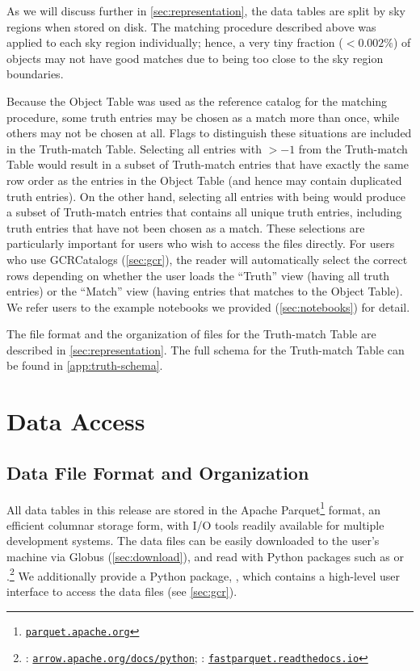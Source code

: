 \documentclass[modern]{descnote}
\newcommand*{\https}[1]{\href{https://#1}{\nolinkurl{#1}}}
\begin{document}
As we will discuss further in \autoref{sec:representation}, the data tables are split by sky regions when stored on disk. The matching procedure described above was applied to each sky region individually; hence, a very tiny fraction ($<0.002\%$) of objects may not have good matches due to being too close to the sky region boundaries. 

Because the Object Table was used as the reference catalog for the matching procedure, some truth entries may be chosen as a match more than once, while others may not be chosen at all.
Flags to distinguish these situations are included in the Truth-match Table. 
Selecting all entries with  $> -1$ from the Truth-match Table would result in a subset of Truth-match entries that have exactly the same row order as the entries in the Object Table (and hence may contain duplicated truth entries). On the other hand, selecting all entries with  being  would produce a subset of Truth-match entries that contains all unique truth entries, including truth entries that have not been chosen as a match.
These selections are particularly important for users who wish to access the files directly. For users who use GCRCatalogs (\autoref{sec:gcr}), the reader will automatically select the correct rows depending on whether the user loads the ``Truth'' view (having all truth entries) or the ``Match'' view (having entries that matches to the Object Table). We refer users to the example notebooks we provided (\autoref{sec:notebooks}) for detail.

The file format and the organization of files for the Truth-match Table are described in \autoref{sec:representation}. The full schema for the Truth-match Table can be found in \autoref{app:truth-schema}.



\section{Data Access}
\label{sec:access}


\subsection{Data File Format and Organization}
\label{sec:representation}

All data tables in this release are stored in the Apache Parquet\footnote{\https{parquet.apache.org}} format, an efficient columnar storage form, with I/O tools readily available for multiple development systems. 
The data files can be easily downloaded to the user's machine via Globus (\autoref{sec:download}), and read with Python packages such as  or .\footnote{: \https{arrow.apache.org/docs/python}; : \https{fastparquet.readthedocs.io}}
We additionally provide a Python package, , which contains a high-level user interface to access the data files (see \autoref{sec:gcr}). 
\end{document}
